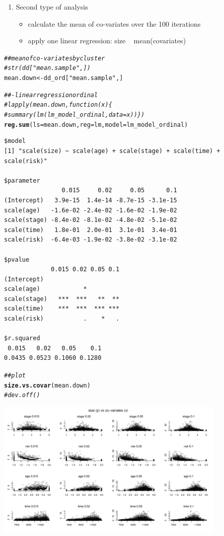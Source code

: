 \documentclass[]{revtex4}\usepackage[]{graphicx}\usepackage[]{color}
\makeatletter
\newcommand{\hlstr}[1]{\textcolor[rgb]{0.192,0.494,0.8}{#1}}%
\newcommand{\hlcom}[1]{\textcolor[rgb]{0.678,0.584,0.686}{\textit{#1}}}%
\newcommand{\hlstd}[1]{\textcolor[rgb]{0.345,0.345,0.345}{#1}}%
\newcommand{\hlkwb}[1]{\textcolor[rgb]{0.69,0.353,0.396}{#1}}%
\newcommand{\hlkwc}[1]{\textcolor[rgb]{0.333,0.667,0.333}{#1}}%
\newcommand{\hlkwd}[1]{\textcolor[rgb]{0.737,0.353,0.396}{\textbf{#1}}}%
\newenvironment{kframe}{%
 \def\at@end@of@kframe{}%
 \ifinner\ifhmode%
  \def\at@end@of@kframe{\end{minipage}}%
  \begin{minipage}{\columnwidth}%
 \fi\fi%
 \def\FrameCommand##1{\hskip\@totalleftmargin \hskip-\fboxsep
 \colorbox{shadecolor}{##1}\hskip-\fboxsep
     \hskip-\linewidth \hskip-\@totalleftmargin \hskip\columnwidth}%
 \MakeFramed {\advance\hsize-\width
   \@totalleftmargin\z@ \linewidth\hsize
   \@setminipage}}%
 {\par\unskip\endMakeFramed%
 \at@end@of@kframe}
\newenvironment{knitrout}{}{} %
\makeatother
\begin{document}
\begin{itemize}
\begin{enumerate}
\item Second type of analysis
      \begin{itemize}
      \item calculate the mean of co-variates over the 100 iterations
      \item apply one linear regression: size ~ mean(covariates)
      \end{itemize}
    \end{enumerate}
\end{itemize}

\begin{knitrout}
\color{fgcolor}\begin{kframe}
\begin{alltt}
  \hlcom{## mean of co-variates by cluster}
  \hlcom{# str(dd["mean.sample",])}
  \hlstd{mean.down} \hlkwb{<-} \hlstd{dd_ord[}\hlstr{"mean.sample"}\hlstd{,]}

  \hlcom{##- linear regression ordinal}
\hlcom{#    lapply(mean.down, function(x) \{}
\hlcom{#    summary(lm(lm_model_ordinal, data = x))\})}
  \hlkwd{reg.sum}\hlstd{(}\hlkwc{ls} \hlstd{= mean.down,} \hlkwc{reg} \hlstd{= lm,} \hlkwc{model} \hlstd{= lm_model_ordinal)}
\end{alltt}
\begin{verbatim}
$model
[1] "scale(size) ~ scale(age) + scale(stage) + scale(time) + scale(risk)"

$parameter
                0.015     0.02     0.05      0.1
(Intercept)   3.9e-15  1.4e-14 -8.7e-15 -3.1e-15
scale(age)   -1.6e-02 -2.4e-02 -1.6e-02 -1.9e-02
scale(stage) -8.4e-02 -8.1e-02 -4.8e-02 -5.1e-02
scale(time)   1.8e-01  2.0e-01  3.1e-01  3.4e-01
scale(risk)  -6.4e-03 -1.9e-02 -3.8e-02 -3.1e-02

$pvalue
             0.015 0.02 0.05 0.1
(Intercept)                     
scale(age)            *         
scale(stage)   ***  ***   **  **
scale(time)    ***  ***  *** ***
scale(risk)           .    *   .

$r.squared
 0.015   0.02   0.05    0.1 
0.0435 0.0523 0.1060 0.1280 
\end{verbatim}
\begin{alltt}
  \hlcom{## plot}
  \hlkwd{size.vs.covar}\hlstd{(mean.down)}
  \hlcom{# dev.off()}
\end{alltt}
\end{kframe}

{\centering \includegraphics[width=11cm]{figure/plotrun_down-sample_2-1} 

}
\end{knitrout}
\end{document}
